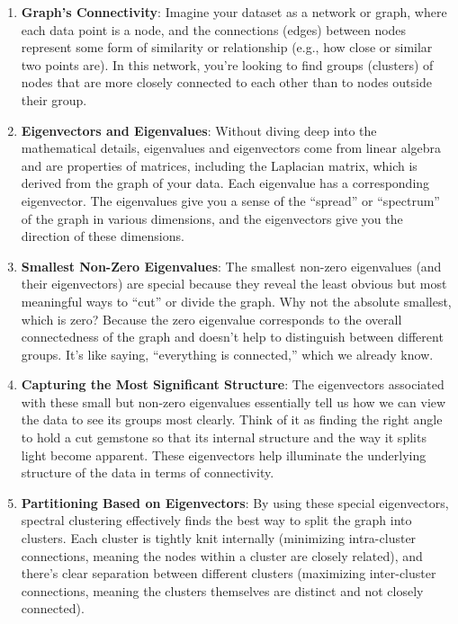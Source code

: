 \documentclass[11pt]{article}
\begin{document}
\begin{enumerate}
\def\labelenumi{\arabic{enumi}.}
\item
  \textbf{Graph's Connectivity}: Imagine your dataset as a network or
  graph, where each data point is a node, and the connections (edges)
  between nodes represent some form of similarity or relationship (e.g.,
  how close or similar two points are). In this network, you're looking
  to find groups (clusters) of nodes that are more closely connected to
  each other than to nodes outside their group.
\item
  \textbf{Eigenvectors and Eigenvalues}: Without diving deep into the
  mathematical details, eigenvalues and eigenvectors come from linear
  algebra and are properties of matrices, including the Laplacian
  matrix, which is derived from the graph of your data. Each eigenvalue
  has a corresponding eigenvector. The eigenvalues give you a sense of
  the ``spread'' or ``spectrum'' of the graph in various dimensions, and
  the eigenvectors give you the direction of these dimensions.
\item
  \textbf{Smallest Non-Zero Eigenvalues}: The smallest non-zero
  eigenvalues (and their eigenvectors) are special because they reveal
  the least obvious but most meaningful ways to ``cut'' or divide the
  graph. Why not the absolute smallest, which is zero? Because the zero
  eigenvalue corresponds to the overall connectedness of the graph and
  doesn't help to distinguish between different groups. It's like
  saying, ``everything is connected,'' which we already know.
\item
  \textbf{Capturing the Most Significant Structure}: The eigenvectors
  associated with these small but non-zero eigenvalues essentially tell
  us how we can view the data to see its groups most clearly. Think of
  it as finding the right angle to hold a cut gemstone so that its
  internal structure and the way it splits light become apparent. These
  eigenvectors help illuminate the underlying structure of the data in
  terms of connectivity.
\item
  \textbf{Partitioning Based on Eigenvectors}: By using these special
  eigenvectors, spectral clustering effectively finds the best way to
  split the graph into clusters. Each cluster is tightly knit internally
  (minimizing intra-cluster connections, meaning the nodes within a
  cluster are closely related), and there's clear separation between
  different clusters (maximizing inter-cluster connections, meaning the
  clusters themselves are distinct and not closely connected).
\end{enumerate}
\end{document}
